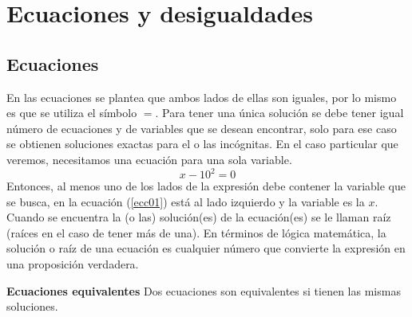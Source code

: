 \chapter{Ecuaciones y desigualdades}
\label{EyD}

\section{Ecuaciones}
\label{ecc0}

En las ecuaciones se plantea que ambos lados de ellas son iguales, por lo mismo es que se utiliza el símbolo $=$. Para tener una única solución se debe tener igual número de ecuaciones y de variables que se desean encontrar, solo para ese caso se obtienen soluciones exactas para el o las incógnitas. En el caso particular que veremos, necesitamos una ecuación para una sola variable.\\
\begin{equation}
x-10^{2}=0 \label{ecc01}
\end{equation} 
Entonces, al menos uno de los lados de la expresión debe contener la variable que se busca, en la ecuación (\ref{ecc01}) está al lado izquierdo y la variable es la $x$. Cuando se encuentra la (o las) solución(es) de la ecuación(es) se le llaman raíz (raíces en el caso de tener más de una). En términos de lógica matemática, la solución o raíz de una ecuación es cualquier número que convierte la expresión en una proposición verdadera.\\

\begin{mydef}
\textbf{Ecuaciones equivalentes} Dos ecuaciones son equivalentes si tienen las mismas soluciones.
\end{mydef} 

